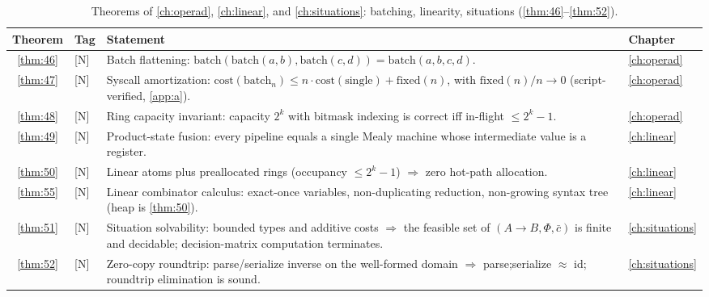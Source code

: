 \begin{table}[!htbp]
\centering
\caption{Theorems of \autoref{ch:operad}, \autoref{ch:linear}, and \autoref{ch:situations}: batching, linearity, situations (\autoref{thm:46}--\autoref{thm:52}).}
\label{tab:thm-operad-linear-situ}
\small
\begin{tabular}{@{}clp{7.2cm}l@{}}
\toprule
Theorem & Tag & Statement & Chapter\\
\midrule
\ref{thm:46} & [N] & Batch flattening: $\mathrm{batch} (\mathrm{batch} (a,b),\mathrm{batch} (c,d)) = \mathrm{batch} (a,b,c,d)$. & \autoref{ch:operad}\\
\ref{thm:47} & [N] & Syscall amortization: $\mathrm{cost} (\mathrm{batch}_n) \le n\cdot\mathrm{cost} (\mathrm{single}) + \mathrm{fixed} (n)$, with $\mathrm{fixed} (n)/n \to 0$ (script-verified, \autoref{app:a}). & \autoref{ch:operad}\\
\ref{thm:48} & [N] & Ring capacity invariant: capacity $2^k$ with bitmask indexing is correct iff in-flight $\le 2^k - 1$. & \autoref{ch:operad}\\
\ref{thm:49} & [N] & Product-state fusion: every pipeline equals a single Mealy machine whose intermediate value is a register. & \autoref{ch:linear}\\
\ref{thm:50} & [N] & Linear atoms plus preallocated rings (occupancy $\le 2^k-1$) $\Rightarrow$ zero hot-path allocation. & \autoref{ch:linear}\\
\ref{thm:55} & [N] & Linear combinator calculus: exact-once variables, non-duplicating reduction, non-growing syntax tree (heap is \ref{thm:50}). & \autoref{ch:linear}\\
\ref{thm:51} & [N] & Situation solvability: bounded types and additive costs $\Rightarrow$ the feasible set of $(A\to B,\Phi,\bar c)$ is finite and decidable; decision-matrix computation terminates. & \autoref{ch:situations}\\
\ref{thm:52} & [N] & Zero-copy roundtrip: parse/serialize inverse on the well-formed domain $\Rightarrow$ parse;serialize $\approx$ id; roundtrip elimination is sound. & \autoref{ch:situations}\\
\bottomrule
\end{tabular}
\end{table}

